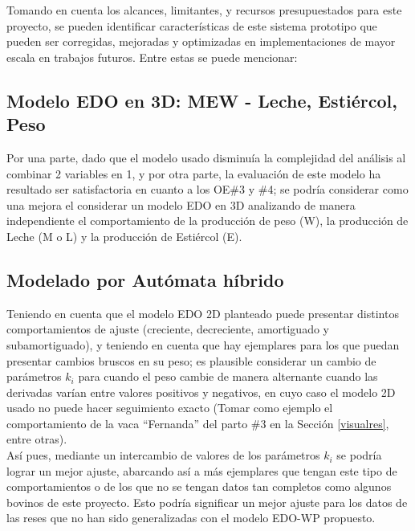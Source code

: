 Tomando en cuenta los alcances, limitantes, y recursos presupuestados para este proyecto, se pueden identificar características de este sistema prototipo que pueden ser corregidas, mejoradas y optimizadas en implementaciones de mayor escala en trabajos futuros. Entre estas se puede mencionar:

\subsection{Modelo EDO en 3D: MEW - Leche, Estiércol, Peso}

Por una parte, dado que el modelo usado disminuía la complejidad del análisis al combinar 2 variables en 1, y por otra parte, la evaluación de este modelo ha resultado ser satisfactoria en cuanto a los OE\#3 y \#4; se podría considerar como una mejora el considerar un modelo EDO en 3D analizando de manera independiente el comportamiento de la producción de peso (W), la producción de Leche (M o L) y la producción de Estiércol (E).

\subsection{Modelado por Autómata híbrido}
Teniendo en cuenta que el modelo EDO 2D planteado puede presentar distintos comportamientos de ajuste (creciente, decreciente, amortiguado y subamortiguado), y teniendo en cuenta que hay ejemplares para los que puedan presentar cambios bruscos en su peso; es plausible considerar un cambio de parámetros $k_{i}$ para cuando el peso cambie de manera alternante cuando las derivadas varían entre valores positivos y negativos, en cuyo caso el modelo 2D usado no puede hacer seguimiento exacto (Tomar como ejemplo el comportamiento de la vaca ``Fernanda'' del parto \#3 en la Sección \ref{visualres}, entre otras).\\

Así pues, mediante un intercambio de valores de los parámetros $k_{i}$ se podría lograr un mejor ajuste, abarcando así a más ejemplares que tengan este tipo de comportamientos o de los que no se tengan datos tan completos como algunos bovinos de este proyecto. Esto podría significar un mejor ajuste para los datos de las reses que no han sido generalizadas con el modelo EDO-WP propuesto.



